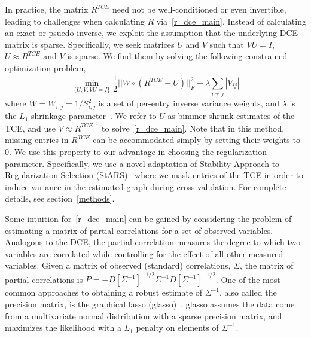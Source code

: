 \documentclass{article}
\begin{document}
In practice, the matrix $R^{TCE}$ need not be well-conditioned or
 even invertible, leading
to challenges when calculating $R$ via~\eqref{r_dce_main}. Instead of calculating an exact
or psuedo-inverse, we exploit the assumption that the underlying
DCE matrix is sparse. Specifically, we seek matrices $U$ and $V$ such that $VU=I$, $U \approx R^{TCE}$
and $V$ is sparse. We find them by solving the following constrained optimization problem,
\begin{equation} \label{opt_main}
\min_{\{U, V : VU = I\}} \frac{1}{2} ||W \circ (R^{TCE} - U)||_F^2 +
   \lambda \sum_{i\neq j}|V_{ij}|
\end{equation}
where $W = W_{i,j} = 1/S_{i,j}^2$ is a set of per-entry inverse variance weights,
and $\lambda$ is the $L_1$ shrinkage parameter~\cite{Friedman2007,Tishbirani1996}.
We refer to $U$ as bimmer shrunk estimates of the TCE, and
use $V \approx R^{TCE^{-1}}$ to solve~\eqref{r_dce_main}.
 Note that in this method, missing entries in $R^{TCE}$ can be accommodated simply
by setting their weights to 0. We use this property to our advantage in choosing the
regularization parameter. Specifically, we use a novel adaptation of Stability Approach
to Regularization Selection (StARS)~\cite{Liu2010} where we mask entries of the TCE
in order to induce variance in the estimated graph during cross-validation.
For complete details, see section~\ref{methods}.

Some intuition for~\eqref{r_dce_main} can be gained by considering the problem
of estimating a matrix of partial correlations for a set of observed variables.
Analogous to the DCE, the partial correlation measures the degree to which two
variables are correlated while controlling for the effect of all other measured
variables. Given a matrix of observed (standard) correlations, $\Sigma$, the matrix of
partial correlations is $P = -D[\Sigma^{-1}]^{-1/2} \Sigma^{-1} D[\Sigma^{-1}]^{-1/2}$. One of
the most common approaches to obtaining a robust estimate of $\Sigma^{-1}$, also called
the precision matrix, is the graphical lasso (glasso)~\cite{Friedman2007}.
glasso assumes the data come from a multivariate normal distribution with a sparse
precision matrix, and maximizes the likelihood with a $L_1$ penalty on elements of $\Sigma^{-1}$.
\end{document}
